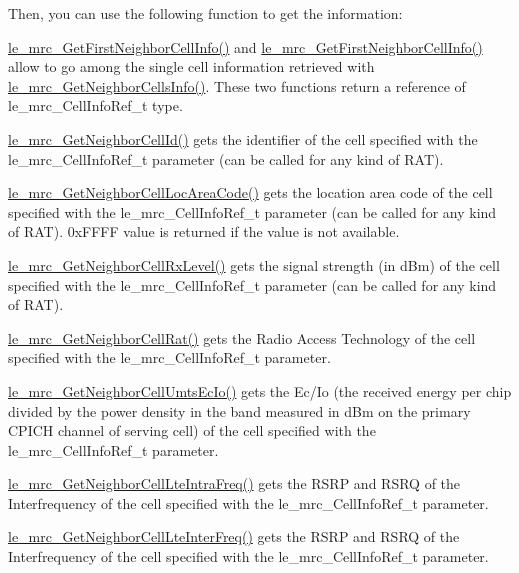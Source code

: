 Then, you can use the following function to get the information\+:
\begin{DoxyItemize}
\item \hyperlink{le__mrc__interface_8h_ab50724fd74818d71da1dfcd2217dd795}{le\+\_\+mrc\+\_\+\+Get\+First\+Neighbor\+Cell\+Info()} and \hyperlink{le__mrc__interface_8h_ab50724fd74818d71da1dfcd2217dd795}{le\+\_\+mrc\+\_\+\+Get\+First\+Neighbor\+Cell\+Info()} allow to go among the single cell information retrieved with \hyperlink{le__mrc__interface_8h_a8d44fe46e61f3399c5e0dd6002b042ae}{le\+\_\+mrc\+\_\+\+Get\+Neighbor\+Cells\+Info()}. These two functions return a reference of le\+\_\+mrc\+\_\+\+Cell\+Info\+Ref\+\_\+t type.
\item \hyperlink{le__mrc__interface_8h_abdbc94e474235417d8610e2eb95558eb}{le\+\_\+mrc\+\_\+\+Get\+Neighbor\+Cell\+Id()} gets the identifier of the cell specified with the le\+\_\+mrc\+\_\+\+Cell\+Info\+Ref\+\_\+t parameter (can be called for any kind of R\+A\+T).
\item \hyperlink{le__mrc__interface_8h_a70ba0ca70367bc673a6bca1e246bb88f}{le\+\_\+mrc\+\_\+\+Get\+Neighbor\+Cell\+Loc\+Area\+Code()} gets the location area code of the cell specified with the le\+\_\+mrc\+\_\+\+Cell\+Info\+Ref\+\_\+t parameter (can be called for any kind of R\+A\+T). 0x\+F\+F\+F\+F value is returned if the value is not available.
\item \hyperlink{le__mrc__interface_8h_aeae116235802afd041afd9df009642aa}{le\+\_\+mrc\+\_\+\+Get\+Neighbor\+Cell\+Rx\+Level()} gets the signal strength (in d\+Bm) of the cell specified with the le\+\_\+mrc\+\_\+\+Cell\+Info\+Ref\+\_\+t parameter (can be called for any kind of R\+A\+T).
\item \hyperlink{le__mrc__interface_8h_a5bb3e75b74260a9cee57247e1968a31f}{le\+\_\+mrc\+\_\+\+Get\+Neighbor\+Cell\+Rat()} gets the Radio Access Technology of the cell specified with the le\+\_\+mrc\+\_\+\+Cell\+Info\+Ref\+\_\+t parameter.
\item \hyperlink{le__mrc__interface_8h_a94e452e3d7063d3359dcbb97a31b984b}{le\+\_\+mrc\+\_\+\+Get\+Neighbor\+Cell\+Umts\+Ec\+Io()} gets the Ec/\+Io (the received energy per chip divided by the power density in the band measured in d\+Bm on the primary C\+P\+I\+C\+H channel of serving cell) of the cell specified with the le\+\_\+mrc\+\_\+\+Cell\+Info\+Ref\+\_\+t parameter.
\item \hyperlink{le__mrc__interface_8h_a7754836120c34cd2610b9777bd56409f}{le\+\_\+mrc\+\_\+\+Get\+Neighbor\+Cell\+Lte\+Intra\+Freq()} gets the R\+S\+R\+P and R\+S\+R\+Q of the Interfrequency of the cell specified with the le\+\_\+mrc\+\_\+\+Cell\+Info\+Ref\+\_\+t parameter.
\item \hyperlink{le__mrc__interface_8h_a331545d4e396c513bba028db981c016b}{le\+\_\+mrc\+\_\+\+Get\+Neighbor\+Cell\+Lte\+Inter\+Freq()} gets the R\+S\+R\+P and R\+S\+R\+Q of the Interfrequency of the cell specified with the le\+\_\+mrc\+\_\+\+Cell\+Info\+Ref\+\_\+t parameter.
\end{DoxyItemize}





